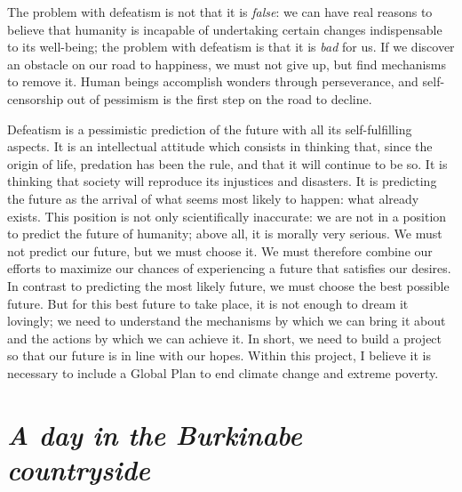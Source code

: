 \documentclass[a5paper,english,openany]{memoir}
\begin{document}
The problem with defeatism is not that it is \textit{false}: we can have real reasons to believe that humanity is incapable of undertaking certain changes indispensable to its well-being; the problem with defeatism is that it is \textit{bad} for us. If we discover an obstacle on our road to happiness, we must not %
give up, but find mechanisms to remove it. Human beings accomplish wonders through perseverance, and self-censorship out of pessimism is the first step on the road to decline. 

Defeatism is a pessimistic prediction of the future %
with all its self-fulfilling aspects. It is an intellectual attitude which consists in thinking that, since the origin of life, predation has been the rule, and that it will continue to be so. It is thinking %
that society will reproduce its injustices and disasters. It is predicting the future as the arrival of what seems most likely to happen: what already exists. This position is not only scientifically inaccurate: we are not in a position to predict the future of humanity; above all, it is morally very serious. %
 We %
 must not predict our future, but %
 we must choose it. %
We must therefore combine our efforts to maximize our chances of experiencing a future that satisfies our desires. In contrast to predicting the most likely future, we must choose the best possible future. But for this best future to take place, it is not enough to dream it lovingly; we need to understand the mechanisms by which we can bring it about %
and the actions by which we can achieve it. In short, we need to build a project so that our future is in line with our hopes.
Within this project, I believe it is necessary to include a Global Plan to end climate change and extreme poverty. %

\chapter*{\textit{A day in the Burkinabe countryside}}\label{ch:narr_burkina}
\end{document}
